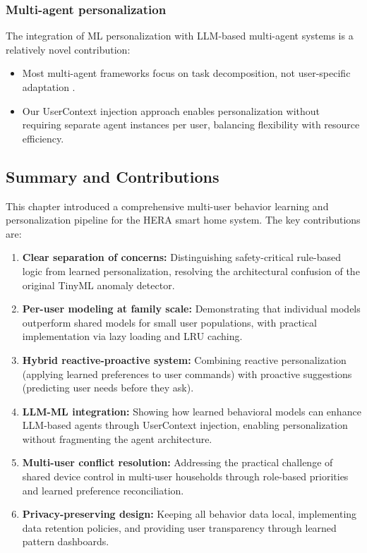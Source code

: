 \subsubsection{Multi-agent personalization}
The integration of ML personalization with LLM-based multi-agent systems
is a relatively novel contribution:
\begin{itemize}
    \item Most multi-agent frameworks focus on task decomposition, not
    user-specific adaptation \cite{langchain_agents_2023}.
    \item Our UserContext injection approach enables personalization
    without requiring separate agent instances per user, balancing
    flexibility with resource efficiency.
\end{itemize}

\subsection{Summary and Contributions}

This chapter introduced a comprehensive multi-user behavior learning and
personalization pipeline for the HERA smart home system. The key
contributions are:

\begin{enumerate}
    \item \textbf{Clear separation of concerns:} Distinguishing
    safety-critical rule-based logic from learned personalization,
    resolving the architectural confusion of the original TinyML anomaly
    detector.
    
    \item \textbf{Per-user modeling at family scale:} Demonstrating that
    individual models outperform shared models for small user populations,
    with practical implementation via lazy loading and LRU caching.
    
    \item \textbf{Hybrid reactive-proactive system:} Combining reactive
    personalization (applying learned preferences to user commands) with
    proactive suggestions (predicting user needs before they ask).
    
    \item \textbf{LLM-ML integration:} Showing how learned behavioral
    models can enhance LLM-based agents through UserContext injection,
    enabling personalization without fragmenting the agent architecture.
    
    \item \textbf{Multi-user conflict resolution:} Addressing the practical
    challenge of shared device control in multi-user households through
    role-based priorities and learned preference reconciliation.
    
    \item \textbf{Privacy-preserving design:} Keeping all behavior data
    local, implementing data retention policies, and providing user
    transparency through learned pattern dashboards.
\end{enumerate}


